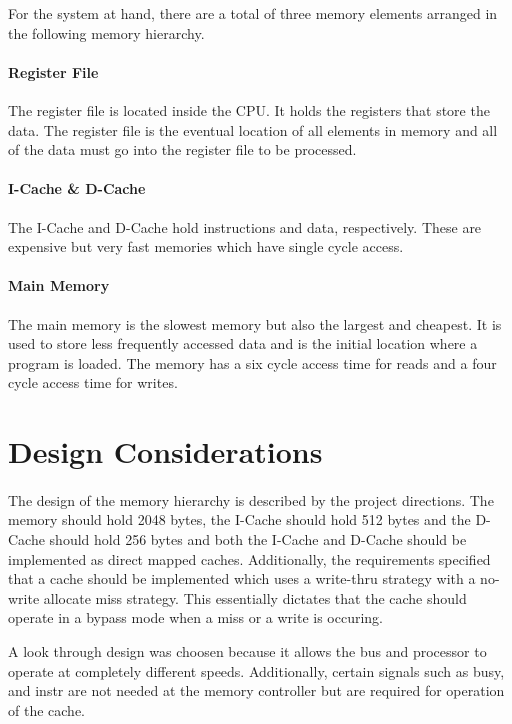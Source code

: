 \documentclass[11pt,letterpaper,final]{article}
\begin{document}
For the system at hand, there are a total of three memory elements arranged in the following memory hierarchy.


\paragraph{Register File}
The register file is located inside the CPU.  It holds the registers that store the data.  The register file is the eventual location of all elements in memory and all of the data must go into the register file to be processed.  

\paragraph{I-Cache \& D-Cache}
The I-Cache and D-Cache hold instructions and data, respectively.  These are expensive but very fast memories which have single cycle access.

\paragraph{Main Memory}
The main memory is the slowest memory but also the largest and cheapest.  It is used to store less frequently accessed data and is the initial location where a program is loaded.  The memory has a six cycle access time for reads and a four cycle access time for writes. 

\section{ Design Considerations }
\paragraph{}
The design of the memory hierarchy is described by the project directions.  The memory should hold 2048 bytes, the I-Cache should hold 512 bytes and the D-Cache should hold 256 bytes and both the I-Cache and D-Cache should be implemented as direct mapped caches.  Additionally, the requirements specified that a cache should be implemented which uses a write-thru strategy with a no-write allocate miss strategy.  This essentially dictates that the cache should operate in a bypass mode when a miss or a write is occuring. 

A look through design was choosen because it allows the bus and processor to operate at completely different speeds.  Additionally, certain signals such as busy, and instr are not needed at the memory controller but are required for operation of the cache.  
\end{document}
